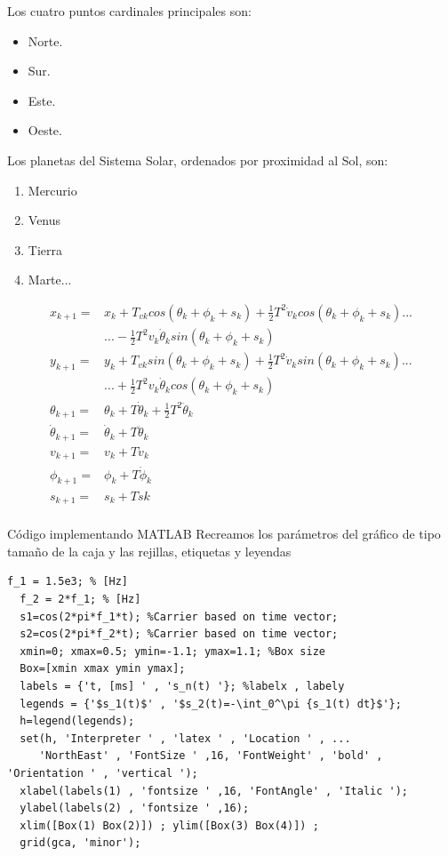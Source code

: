\documentclass[conference,compsoc,onecolumn]{IEEEtran}
\begin{document}
Los cuatro puntos cardinales principales son:
\begin{itemize}
    \item Norte.
    \item Sur.
    \item Este.
    \item Oeste.
\end{itemize}

Los planetas del Sistema Solar, ordenados por proximidad al Sol, son:
\begin{enumerate}
    \item Mercurio
    \item Venus
    \item Tierra
    \item Marte...
\end{enumerate}
\begin{equation}\label{eq_ej}
\begin{split} 
x_{k+1}  = & x_{k}+ T_{v k} cos(\theta_{k} + \phi_{k} + s_{k}) +\frac{1}{2}T^{2}\dot{v}_{k}cos(\theta_{k} + \phi_{k} + s_{k})...\\
& ...-\frac{1}{2}T^{2}v_{k}\dot{\theta}_{k}sin(\theta_{k} + \phi_{k} + s_{k})\\
y_{k+1} = & y_{k}+ T_{v k}sin(\theta_{k} + \phi_{k} + s_{k}) +\frac{1}{2}T^{2}\dot{v}_{k}sin(\theta_{k} + \phi_{k} + s_{k})...\\  
&...+\frac{1}{2}T^{2}v_{k}\dot{\theta}_{k}cos(\theta_{k} + \phi_{k} + s_{k})\\
\theta_{k+1}= & \theta_{k} + T \dot{\theta}_{k}+ \frac{1}{2}T^{2}\ddot{\theta}_{k}\\
\dot{\theta}_{k+1}= & \dot{\theta}_{k} + T\ddot{\theta}_{k}\\
v_{k+1}= &v_{k} + T \dot{v}_{ k}\\ 
\phi_{k+1}= &\phi_{k} + T \dot{\phi} _{k}\\ 
s_{k+1}= & s_{k} + T\dot{s} {k}\\ 
\end{split}
\end{equation}


Código implementando MATLAB Recreamos los parámetros del gráfico de tipo tamaño de la caja y las rejillas,
etiquetas y leyendas

\lstset{language=Matlab, breaklines=true, basicstyle=\footnotesize}
\lstset{numbers=left, numberstyle=\tiny, stepnumber=1, numbersep=-2pt}
\begin{lstlisting}[frame=single]
  f_1 = 1.5e3; % [Hz]
  f_2 = 2*f_1; % [Hz]
  s1=cos(2*pi*f_1*t); %Carrier based on time vector; 
  s2=cos(2*pi*f_2*t); %Carrier based on time vector; 
  xmin=0; xmax=0.5; ymin=-1.1; ymax=1.1; %Box size 
  Box=[xmin xmax ymin ymax]; 
  labels = {'t, [ms] ' , 's_n(t) '}; %labelx , labely 
  legends = {'$s_1(t)$' , '$s_2(t)=-\int_0^\pi {s_1(t) dt}$'}; 
  h=legend(legends); 
  set(h, 'Interpreter ' , 'latex ' , 'Location ' , ... 
     'NorthEast' , 'FontSize ' ,16, 'FontWeight' , 'bold' , 'Orientation ' , 'vertical '); 
  xlabel(labels(1) , 'fontsize ' ,16, 'FontAngle' , 'Italic '); 
  ylabel(labels(2) , 'fontsize ' ,16); 
  xlim([Box(1) Box(2)]) ; ylim([Box(3) Box(4)]) ; 
  grid(gca, 'minor');
\end{lstlisting}


\nocite{*}

\label{sec:biblio}
% 





\end{document}
